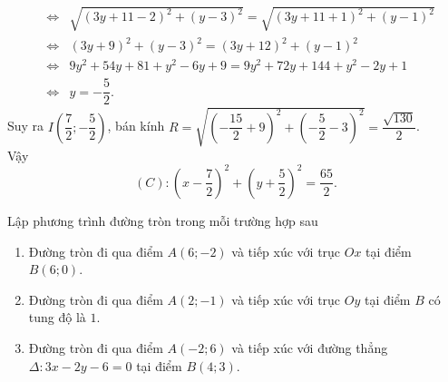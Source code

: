 \begin{bt}
{\begin{enumerate}
\begin{eqnarray*}
				&\Leftrightarrow&\sqrt{(3y+11-2)^2+(y-3)^2}=\sqrt{(3y+11+1)^2+(y-1)^2}\\
				&\Leftrightarrow&(3y+9)^2+(y-3)^2=(3y+12)^2+(y-1)^2\\
				&\Leftrightarrow&9y^2+54y+81+y^2-6y+9=9y^2+72y+144+y^2-2y+1\\
				&\Leftrightarrow&y=-\dfrac{5}{2}.
			\end{eqnarray*}
			Suy ra $ I\left(\dfrac{7}{2};-\dfrac{5}{2}\right) $, bán kính $ R= \sqrt{\left(-\dfrac{15}{2}+9\right)^2+\left(-\dfrac{5}{2}-3\right)^2}=\dfrac{\sqrt{130}}{2}$.\\
			Vậy $$(C)\colon \left(x-\dfrac{7}{2}\right)^2+\left(y+\dfrac{5}{2}\right)^2=\dfrac{65}{2}.$$
		\end{enumerate}
	}
\end{bt}
\begin{bt}%
	Lập phương trình đường tròn trong mỗi trường hợp sau
	\begin{enumerate}
		\item Đường tròn đi qua điểm $A(6;-2) $ và tiếp xúc với trục  $Ox  $ tại điểm  $B(6;0) $.
		\item Đường tròn đi qua điểm $A(2;-1) $ và tiếp xúc với trục  $Oy  $ tại điểm  $B$ có tung độ là $ 1 $.
		\item Đường tròn đi qua điểm $A(-2;6) $ và tiếp xúc với đường thẳng $ \Delta \colon 3x-2y-6=0 $ tại điểm  $B(4;3) $.
	\end{enumerate}
\end{bt}
